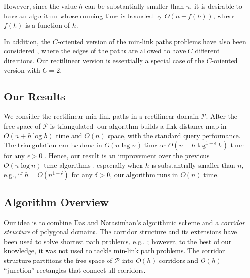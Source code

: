 \documentclass[english,runningheads,11pt]{llncs-revised}
\def\calP{\mathcal{P}}
\begin{document}
However, since the value $h$ can be substantially smaller than
$n$, it is desirable to have an
algorithm whose running time is bounded by $O(n+f(h))$, where $f(h)$
is a function of $h$.


In addition, the $C$-oriented version of the min-link paths problems have also been
considered \cite{ref:AdegeestMi94,ref:HershbergerCo94,ref:MitchellMi14},
where the edges of the paths are allowed to have $C$
different directions. Our rectilinear version is essentially a special
case of the $C$-oriented version with $C=2$.
	



\subsection{Our Results}
We consider the rectilinear min-link paths in a rectilinear domain $\calP$.
After the free space of $\calP$ is triangulated,
our algorithm builds a link distance map in
$O(n+h\log h)$ time and $O(n)$ space, with the standard query performance.
The triangulation can be done
in $O(n\log n)$ time or $O(n+h\log^{1+\epsilon}h)$
time for any $\epsilon>0$ \cite{ref:Bar-YehudaTr94}.
Hence, our result is an improvement over the previous $O(n\log n)$
time algorithms \cite{ref:DasGe91,ref:MitchellMi14,ref:SatoA87}, especially
 when $h$ is substantially smaller than $n$, e.g., if $h=O(n^{1-\delta})$ for any
$\delta>0$, our algorithm runs in $O(n)$ time.







\subsection{Algorithm Overview}
Our idea is to combine Das and
Narasimhan's algorithmic scheme
\cite{ref:DasGe91} and a {\em corridor structure} of polygonal
domains.  The corridor structure and its extensions have been used to solve
shortest path problems, e.g.,
\cite{ref:ChenTw14,ref:ChenA11ESA,ref:KapoorAn97,ref:MitchellSe95};
however, to the best of our knowledge, it was not used to tackle
min-link path problems. The corridor structure partitions the free
space of $\calP$ into $O(h)$ corridors and $O(h)$ ``junction''
rectangles that connect all corridors.
\end{document}
